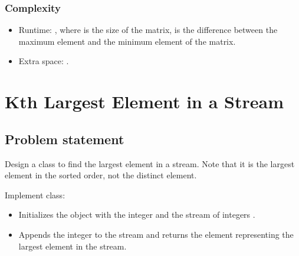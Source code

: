 \documentclass[letterpaper,12pt,english]{book}
\begin{document}
\subsubsection{Complexity}
\label{\detokenize{Priority_Queue/378_Kth_Smallest_Element_in_a_Sorted_Matrix:id4}}\begin{itemize}
\item {} 
\sphinxAtStartPar
Runtime: , where  is the size of the matrix,  is the difference between the maximum element and the minimum element of the matrix.

\item {} 
\sphinxAtStartPar
Extra space: .

\end{itemize}

\sphinxstepscope


\section{Kth Largest Element in a Stream}
\label{\detokenize{Priority_Queue/703_Kth_Largest_Element_in_a_Stream:kth-largest-element-in-a-stream}}\label{\detokenize{Priority_Queue/703_Kth_Largest_Element_in_a_Stream::doc}}

\subsection{Problem statement\sphinxfootnotemark[64]}
\label{\detokenize{Priority_Queue/703_Kth_Largest_Element_in_a_Stream:problem-statement}}%
\begin{footnotetext}[64]\sphinxAtStartFootnote
{}
%
\end{footnotetext}\ignorespaces 
\sphinxAtStartPar
Design a class to find the  largest element in a stream. Note that it is the  largest element in the sorted order, not the  distinct element.

\sphinxAtStartPar
Implement  class:
\begin{itemize}
\item {} 
\sphinxAtStartPar
{} Initializes the object with the integer  and the stream of integers .

\item {} 
\sphinxAtStartPar
{} Appends the integer  to the stream and returns the element representing the  largest element in the stream.

\end{itemize}
\end{document}

